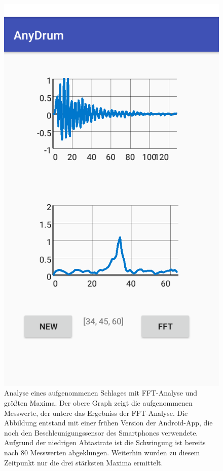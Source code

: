 \begin{figure}[H]
	\centering
	\includegraphics[scale=0.4]{figures/gui_FFT.png}
	\caption{Analyse eines aufgenommenen Schlages mit FFT-Analyse und größten Maxima. Der obere Graph zeigt die aufgenommenen Messwerte, der untere das Ergebniss der FFT-Analyse. Die Abbildung entstand mit einer frühen Version der Android-App, die noch den Beschleunigungssensor des Smartphones verwendete. Aufgrund der niedrigen Abtastrate ist die Schwingung ist bereits nach 80 Messwerten abgeklungen. Weiterhin wurden zu diesem Zeitpunkt nur die drei stärksten Maxima ermittelt.}
	\label{fig:guiA}
\end{figure}


